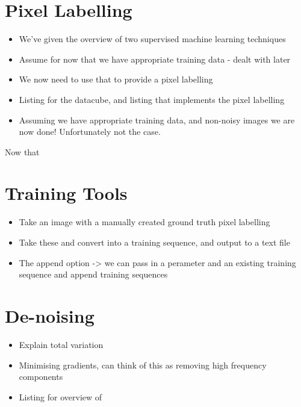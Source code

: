 \documentclass[12pt,twoside,notitlepage]{report}
\begin{document}
    \section{Pixel Labelling} \label{sec:pixel_label}
        \begin{itemize}
            \item We've given the overview of two supervised machine learning techniques
            \item Assume for now that we have appropriate training data - dealt with later
            \item We now need to use that to provide a pixel labelling
            \item Listing for the datacube, and listing that implements the pixel labelling
            \item Assuming we have appropriate training data, and non-noisy images we are now done! Unfortunately not the case.
        \end{itemize}

        Now that 





    \section{Training Tools} \label{sec:training_tools}
        \begin{itemize}
            \item Take an image with a manually created ground truth pixel labelling
            \item Take these and convert into a training sequence, and output to a text file
            \item The append option -> we can pass in a perameter and an existing training sequence and append training sequences
        \end{itemize}

    \section{De-noising} \label{sec:de-noising}
        \begin{itemize}
            \item Explain total variation
            \item Minimising gradients, can think of this as removing high frequency components
            \item Listing for overview of 
        \end{itemize}
\end{document}
